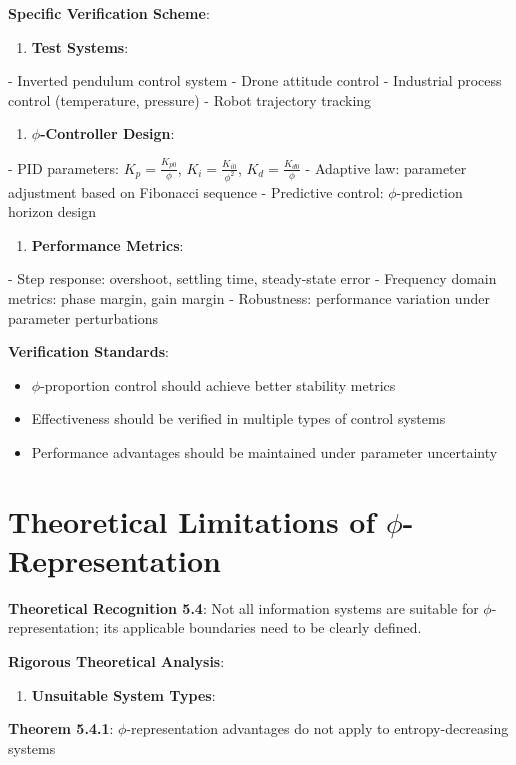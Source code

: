\textbf{Specific Verification Scheme}:
\begin{enumerate}
\item \textbf{Test Systems}:
\end{enumerate}
   - Inverted pendulum control system
   - Drone attitude control
   - Industrial process control (temperature, pressure)
   - Robot trajectory tracking

\begin{enumerate}
\item \textbf{$\phi$-Controller Design}:
\end{enumerate}
   - PID parameters: $K_p = \frac{K_{p0}}{\phi}$, $K_i = \frac{K_{i0}}{\phi^2}$, $K_d = \frac{K_{d0}}{\phi}$
   - Adaptive law: parameter adjustment based on Fibonacci sequence
   - Predictive control: $\phi$-prediction horizon design

\begin{enumerate}
\item \textbf{Performance Metrics}:
\end{enumerate}
   - Step response: overshoot, settling time, steady-state error
   - Frequency domain metrics: phase margin, gain margin
   - Robustness: performance variation under parameter perturbations

\textbf{Verification Standards}:
\begin{itemize}
\item $\phi$-proportion control should achieve better stability metrics
\item Effectiveness should be verified in multiple types of control systems
\item Performance advantages should be maintained under parameter uncertainty
\end{itemize}

\section{Theoretical Limitations of $\phi$-Representation}
\label{sec:ch05_applications:theoretical-limitations-of-phi-representation}

\textbf{Theoretical Recognition 5.4}: Not all information systems are suitable for $\phi$-representation; its applicable boundaries need to be clearly defined.

\textbf{Rigorous Theoretical Analysis}:

\begin{enumerate}
\item \textbf{Unsuitable System Types}:
\end{enumerate}
   \textbf{Theorem 5.4.1}: $\phi$-representation advantages do not apply to entropy-decreasing systems
\label{thm:5.4.1}
   
